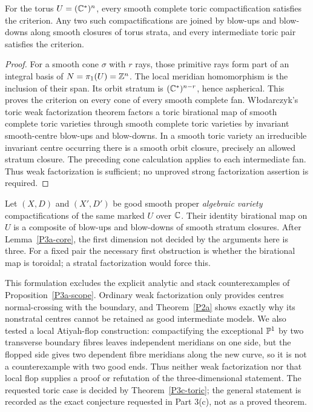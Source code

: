 \begin{theorem}\label{P3c-toric}
For the torus $U=(\mathbb C^*)^n$, every smooth complete toric compactification
satisfies the criterion.  Any two such compactifications are joined by
blow-ups and blow-downs along smooth closures of torus strata, and every
intermediate toric pair satisfies the criterion.
\end{theorem}
\begin{proof}
For a smooth cone $\sigma$ with $r$ rays, those primitive rays form part of an
integral basis of $N=\pi_1(U)=\mathbb Z^n$.  The local meridian homomorphism is the
inclusion of their span.  Its orbit stratum is $(\mathbb C^*)^{n-r}$, hence
aspherical.  This proves the criterion on every cone of every smooth complete
fan.  W\l odarczyk's toric weak factorization theorem
\citep[Theorem 4.7.1]{Wlodarczyk2006} factors a toric birational map of smooth
complete toric varieties through smooth complete toric varieties by invariant
smooth-centre blow-ups and blow-downs.  In a smooth toric variety an irreducible
invariant centre occurring there is a smooth orbit closure, precisely an
allowed stratum closure.  The preceding cone calculation applies to each
intermediate fan.  Thus weak factorization is sufficient; no unproved strong
factorization assertion is required.
\end{proof}

\begin{conjecture}\label{P3c-general}
Let $(X,D)$ and $(X',D')$ be good smooth proper \emph{algebraic variety}
compactifications of the same marked $U$ over $\mathbb C$.  Their identity birational
map on $U$ is a composite of blow-ups and blow-downs of smooth stratum closures.
After Lemma~\ref{P3a-core}, the first dimension not decided by the arguments
here is three.  For a fixed pair the necessary first obstruction is whether
the birational map is toroidal; a stratal factorization would force this.
\end{conjecture}
This formulation excludes the explicit analytic and stack counterexamples of
Proposition~\ref{P3a-scope}.  Ordinary weak factorization only provides centres
normal-crossing with the boundary, and Theorem~\ref{P2a} shows exactly why its
nonstratal centres cannot be retained as good intermediate models.  We also
tested a local Atiyah-flop construction: compactifying the exceptional
$\mathbb P^1$ by two transverse boundary fibres leaves independent meridians on one
side, but the flopped side gives two dependent fibre meridians along the new
curve, so it is not a counterexample with two good ends.  Thus neither weak
factorization nor that local flop supplies a proof or refutation of the
three-dimensional statement.  The requested toric case is decided by
Theorem~\ref{P3c-toric}; the general statement is recorded as the exact
conjecture requested in Part 3(c), not as a proved theorem.
